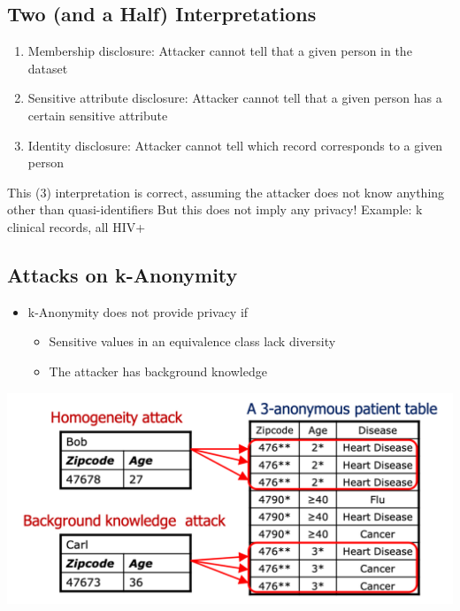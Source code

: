 \documentclass[11pt]{article}
\theoremstyle{definition}
\begin{document}
\subsection{Two (and a Half) Interpretations}
\begin{enumerate}
    \item Membership disclosure: Attacker cannot tell that a
    given person in the dataset
    \item Sensitive attribute disclosure: Attacker cannot tell
    that a given person has a certain sensitive
    attribute
    \item Identity disclosure: Attacker cannot tell which
    record corresponds to a given person
\end{enumerate}

This (3) interpretation is correct, assuming the attacker
does not know anything other than quasi-identifiers
But this does not imply any privacy!
Example: k clinical records, all HIV+

\subsection{Attacks on k-Anonymity}
\begin{itemize}
    \item k-Anonymity does not provide privacy if
    \begin{itemize}
        \item Sensitive values in an equivalence class lack diversity
        \item The attacker has background knowledge
    \end{itemize}
\end{itemize}

\includegraphics[width=\textwidth/2]{21.png}
\end{document}
